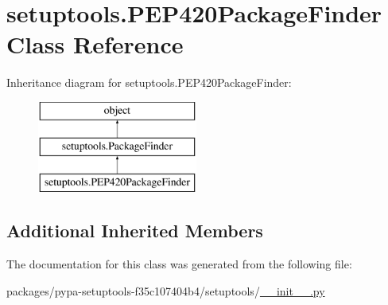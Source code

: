 \hypertarget{classsetuptools_1_1PEP420PackageFinder}{}\section{setuptools.\+P\+E\+P420\+Package\+Finder Class Reference}
\label{classsetuptools_1_1PEP420PackageFinder}
Inheritance diagram for setuptools.\+P\+E\+P420\+Package\+Finder\+:\begin{figure}[H]
\begin{center}
\leavevmode
\includegraphics[height=3.000000cm]{classsetuptools_1_1PEP420PackageFinder}
\end{center}
\end{figure}
\subsection*{Additional Inherited Members}


The documentation for this class was generated from the following file\+:\begin{DoxyCompactItemize}
\item 
packages/pypa-\/setuptools-\/f35c107404b4/setuptools/\hyperlink{packages_2pypa-setuptools-f35c107404b4_2setuptools_2____init_____8py}{\+\_\+\+\_\+init\+\_\+\+\_\+.\+py}\end{DoxyCompactItemize}
